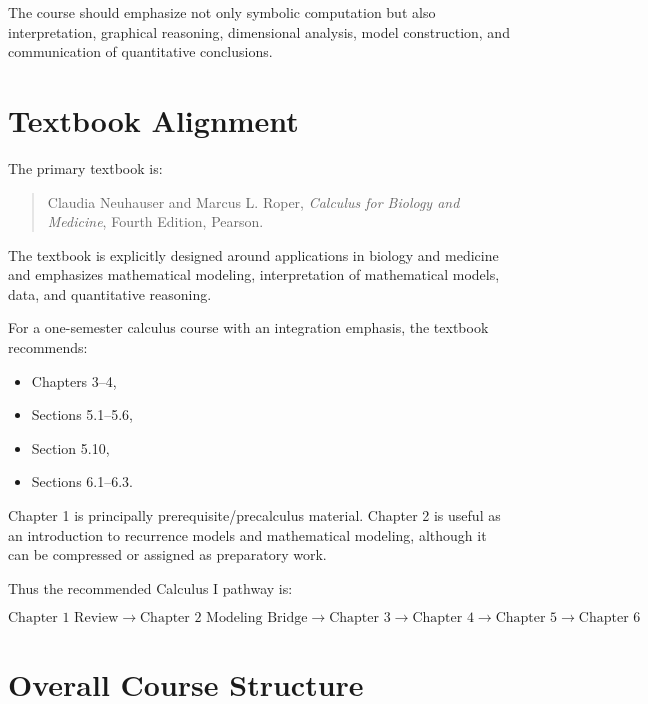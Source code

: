\documentclass[11pt]{article}
\begin{document}
The course should emphasize not only symbolic computation but also
interpretation, graphical reasoning, dimensional analysis, model construction,
and communication of quantitative conclusions.

\section{Textbook Alignment}

The primary textbook is:

\begin{quote}
Claudia Neuhauser and Marcus L. Roper,
\textit{Calculus for Biology and Medicine},
Fourth Edition, Pearson.
\end{quote}

The textbook is explicitly designed around applications in biology and
medicine and emphasizes mathematical modeling, interpretation of mathematical
models, data, and quantitative reasoning.

For a one-semester calculus course with an integration emphasis, the textbook
recommends:

\begin{itemize}
    \item Chapters 3--4,
    \item Sections 5.1--5.6,
    \item Section 5.10,
    \item Sections 6.1--6.3.
\end{itemize}

Chapter 1 is principally prerequisite/precalculus material. Chapter 2 is
useful as an introduction to recurrence models and mathematical modeling,
although it can be compressed or assigned as preparatory work.

Thus the recommended Calculus I pathway is:

\[
\boxed{
\text{Chapter 1 Review}
\rightarrow
\text{Chapter 2 Modeling Bridge}
\rightarrow
\text{Chapter 3}
\rightarrow
\text{Chapter 4}
\rightarrow
\text{Chapter 5}
\rightarrow
\text{Chapter 6}
}
\]

\section{Overall Course Structure}
\end{document}
